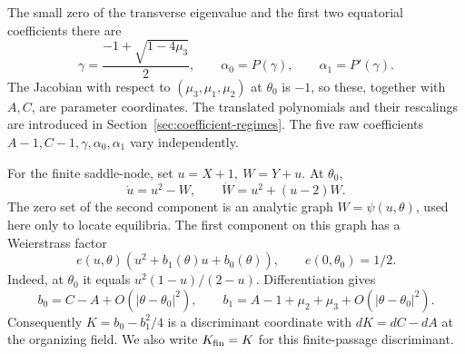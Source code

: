 The small zero of the transverse eigenvalue and the first two
equatorial coefficients there are
\begin{equation}\label{eq:center-parameters}
 \gamma=\frac{-1+\sqrt{1-4\mu_3}}2,\qquad
 \alpha_0=P(\gamma),\qquad \alpha_1=P'(\gamma).
\end{equation}
The Jacobian with respect to \((\mu_3,\mu_1,\mu_2)\) at \(\theta_0\)
is \(-1\), so these, together with \(A,C\), are parameter coordinates.
The translated polynomials and their rescalings are introduced in
Section~\ref{sec:coefficient-regimes}. The five raw coefficients
\(A-1,C-1,\gamma,\alpha_0,\alpha_1\) vary independently.

For the finite saddle-node, set \(u=X+1,\ W=Y+u\).
At \(\theta_0\),
\[
 \dot u=u^2-W,\qquad \dot W=u^2+(u-2)W .
\]
The zero set of the second component is an analytic graph
\(W=\psi(u,\theta)\), used here only to locate equilibria.
The first component on this graph has a Weierstrass factor
\[
 e(u,\theta)(u^2+b_1(\theta)u+b_0(\theta)),\qquad
 e(0,\theta_0)=1/2 .
\]
Indeed, at \(\theta_0\) it equals \(u^2(1-u)/(2-u)\).
Differentiation gives
\[
 b_0=C-A+O(|\theta-\theta_0|^2),\qquad
 b_1=A-1+\mu_2+\mu_3+O(|\theta-\theta_0|^2).
\]
Consequently \(K=b_0-b_1^2/4\) is a discriminant coordinate with
\(dK=dC-dA\) at the organizing field.
We also write \(K_{\rm fin}=K\) for this finite-passage discriminant.

